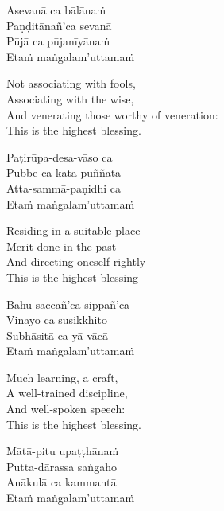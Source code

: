 \begin{pali-hang}
  Asevanā ca bālānaṁ\\
  Paṇḍitānañ'ca sevanā\\
  Pūjā ca pūjanīyānaṁ\\
  Etaṁ maṅgalam'uttamaṁ
\end{pali-hang}

\begin{english-verses}
  Not associating with fools,\\
  Associating with the wise,\\
  And venerating those worthy of veneration:\\
  This is the highest blessing.
\end{english-verses}

\begin{pali-hang-continued}
  Paṭirūpa-desa-vāso ca\\
  Pubbe ca kata-puññatā\\
  Atta-sammā-paṇidhi ca\\
  Etaṁ maṅgalam'uttamaṁ
\end{pali-hang-continued}

\begin{english-verses}
  Residing in a suitable place\\
  Merit done in the past\\
  And directing oneself rightly\\
  This is the highest blessing
\end{english-verses}

\begin{pali-hang-continued}
  Bāhu-saccañ'ca sippañ'ca\\
  Vinayo ca susikkhito\\
  Subhāsitā ca yā vācā\\
  Etaṁ maṅgalam'uttamaṁ
\end{pali-hang-continued}

\begin{english-verses}
  Much learning, a craft,\\
  A well-trained discipline,\\
  And well-spoken speech:\\
  This is the highest blessing.
\end{english-verses}

\begin{pali-hang-continued}
  Mātā-pitu upaṭṭhānaṁ\\
  Putta-dārassa saṅgaho\\
  Anākulā ca kammantā\\
  Etaṁ maṅgalam'uttamaṁ
\end{pali-hang-continued}

